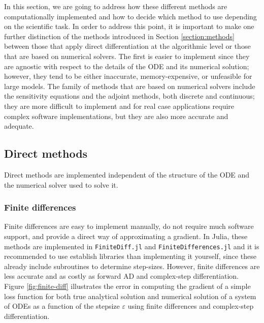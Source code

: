 
In this section, we are going to address how these different methods are computationally implemented and how to decide which method to use depending on the scientific task.
In order to address this point, it is important to make one further distinction of the methods introduced in Section \ref{section:methods} between those that apply direct differentiation at the algorithmic level or those that are based on numerical solvers.  
The first is easier to implement since they are agnostic with respect to the details of the ODE and its numerical solution; however, they tend to be either inaccurate, memory-expensive, or unfeasible for large models. 
The family of methods that are based on numerical solvers include the sensitivity equations and the adjoint methods, both discrete and continuous; they are more difficult to implement and for real case applications require complex software implementations, but they are also more accurate and adequate. 

\subsection{Direct methods}

Direct methods are implemented independent of the structure of the ODE and the numerical solver used to solve it. 

\subsubsection{Finite differences}

Finite differences are easy to implement manually, do not require much software support, and provide a direct way of approximating a gradient. 
In Julia, these methods are implemented in \texttt{FiniteDiff.jl} and \texttt{FiniteDifferences.jl} and it is recommended to use establish libraries than implementing it yourself, since these already include subroutines to determine step-sizes.
However, finite differences are less accurate and as costly as forward AD \cite{Griewack-on-AD} and complex-step differentiation. 
Figure \ref{fig:finite-diff} illustrates the error in computing the gradient of a simple loss function for both true analytical solution and numerical solution of a system of ODEs as a function of the stepsize $\varepsilon$ using finite differences and complex-step differentiation.


